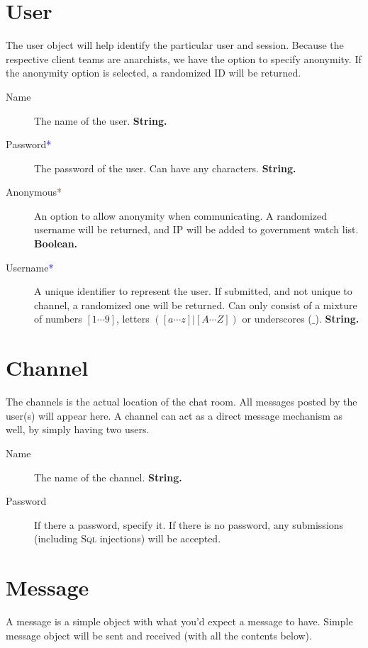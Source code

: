 \documentclass[12pt]{scrartcl}
\newcommand{\req}{\textcolor{red}{*}}
\newcommand{\reqalt}{\textcolor{blue}{*}}
\begin{document}
\section{User}\label{sec:user}
The user object will help identify the particular user and session. Because the respective client teams are anarchists, we have the option to specify anonymity. If the anonymity option is selected, a randomized ID will be returned.

\begin{description}
    \item[Name] The name of the user. \textbf{String.}
    \item[Password\reqalt] The password of the user. Can have any characters. \textbf{String.}
    \item[Anonymous\req] An option to allow anonymity when communicating. A randomized username will be returned, and IP will be added to government watch list. \textbf{Boolean.}
    \item[Username\reqalt] A unique identifier to represent the user. If submitted, and not unique to channel, a randomized one will be returned. Can only consist of a mixture of numbers $[1 \cdots 9]$, letters $([a \cdots z] | [A \cdots Z])$ or underscores ($\_$). \textbf{String.}
\end{description}


\section{Channel}\label{sec:channel}
The channels is the actual location of the chat room. All messages posted by the user(s) will appear here. A channel can act as a direct message mechanism as well, by simply having two users.

\begin{description}
    \item[Name] The name of the channel. \textbf{String.}
    \item[Password] If there a password, specify it. If there is no password, any submissions (including \textsc{Sql} injections) will be accepted.
\end{description}


\section{Message}
A message is a simple object with what you'd expect a message to have. Simple message object will be sent and received (with all the contents below).
\end{document}
